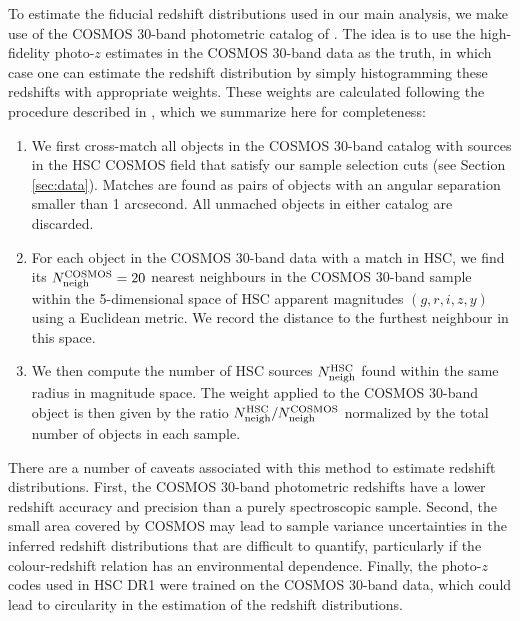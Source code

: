 \documentclass[a4paper,11pt]{article}
\begin{document}
    To estimate the fiducial redshift distributions used in our main analysis, we make use of the COSMOS 30-band photometric catalog of \cite{2016ApJS..224...24L}. The idea is to use the high-fidelity photo-$z$ estimates in the COSMOS 30-band data as the truth, in which case one can estimate the redshift distribution by simply histogramming these redshifts with appropriate weights. These weights are calculated following the procedure described in \cite{2017MNRAS.465.1454H,2019PASJ...71...43H}, which we summarize here for completeness:
    \begin{enumerate}
      \item We first cross-match all objects in the COSMOS 30-band catalog with sources in the HSC COSMOS field that satisfy our sample selection cuts (see Section \ref{sec:data}). Matches are found as pairs of objects with an angular separation smaller than 1 arcsecond. All unmached objects in either catalog are discarded.
      \item For each object in the COSMOS 30-band data with a match in HSC, we find its $N_{\rm neigh}^{\rm COSMOS}=20$ nearest neighbours in the COSMOS 30-band sample within the 5-dimensional space of HSC apparent magnitudes $(g,r,i,z,y)$ using a Euclidean metric. We record the distance to the furthest neighbour in this space.
      \item We then compute the number of HSC sources $N_{\rm neigh}^{\rm HSC}$ found within the same radius in magnitude space. The weight applied to the COSMOS 30-band object is then given by the ratio $N^{\rm HSC}_{\rm neigh}/N^{\rm COSMOS}_{\rm neigh}$ normalized by the total number of objects in each sample.
    \end{enumerate}
    There are a number of caveats associated with this method to estimate redshift distributions. First, the COSMOS 30-band photometric redshifts have a lower redshift accuracy and precision than a purely spectroscopic sample. Second, the small area covered by COSMOS may lead to sample variance uncertainties in the inferred redshift distributions that are difficult to quantify, particularly if the colour-redshift relation has an environmental dependence. Finally, the photo-$z$ codes used in HSC DR1 were trained on the COSMOS 30-band data, which could lead to circularity in the estimation of the redshift distributions.
    
\end{document}
